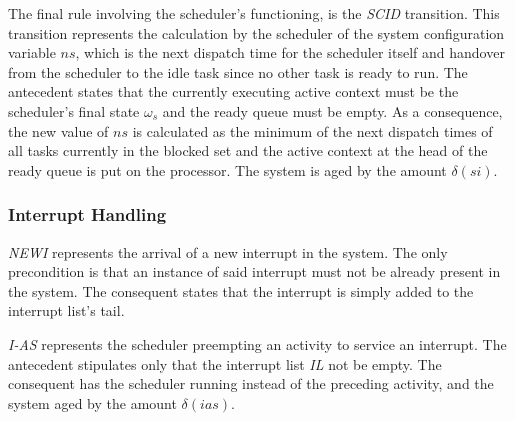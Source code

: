 The final rule involving the scheduler's functioning, is the
\emph{SCID} transition. This transition represents the calculation by
the scheduler of the system configuration variable $ns$, which is the
next dispatch time for the scheduler itself and handover from the
scheduler to the idle task since no other task is ready to run. The
antecedent states that the currently executing active context must be
the scheduler's final state $\omega_s$ and the ready queue must be
empty. As a consequence, the new value of $ns$ is calculated as the
minimum of the next dispatch times of all tasks currently in the
blocked set and the active context at the head of the ready queue is
put on the processor. The system is aged by the amount $\delta(si)$.


\subsubsection{Interrupt Handling}
\emph{NEWI} represents the arrival of a new interrupt in the
system. The only precondition is that an instance of said interrupt
must not be already present in the system. The consequent states that
the interrupt is simply added to the interrupt list's tail.


\emph{I-AS} represents the scheduler preempting an activity to service
an interrupt. The antecedent stipulates only that the interrupt list
\emph{IL} not be empty. The consequent has the scheduler running
instead of the preceding activity, and the system aged by the amount
$\delta(ias)$. 

